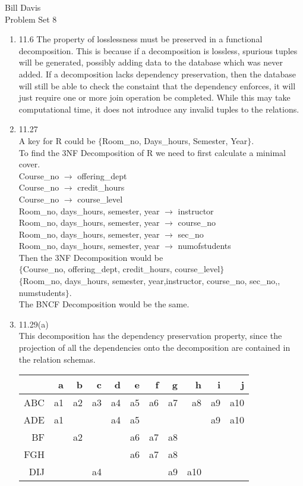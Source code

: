 \documentclass[11pt,fleqn]{article}
\begin{document}
\noindent Bill Davis \\
 Problem Set 8
\begin{enumerate}
\item 11.6 %
The property of losslessness must be preserved in a functional decomposition. This is because if a decomposition is lossless, spurious tuples will be generated, possibly adding data to the database which was never added. If a decomposition lacks dependency preservation, then the database will still be able to check the constaint that the dependency enforces, it will just require one or more join operation be completed. While this may take computational time, it does not introduce any invalid tuples to the relations. 
\item 11.27 \\
A key for R could be $\{$Room\_no, Days\_hours, Semester, Year$\}$. \\
To find the 3NF Decomposition of R we need to first calculate a minimal cover. \\
Course\_no $\rightarrow$ offering\_dept \\
Course\_no $\rightarrow$ credit\_hours \\ 
Course\_no $\rightarrow$ course\_level \\
Room\_no, days\_hours, semester, year $\rightarrow$ instructor \\
Room\_no, days\_hours, semester, year $\rightarrow$ course\_no \\
Room\_no, days\_hours, semester, year $\rightarrow$ sec\_no \\
Room\_no, days\_hours, semester, year $\rightarrow$ numofstudents \\
Then the 3NF Decomposition would be \\
$\{$Course\_no, offering\_dept, credit\_hours, course\_level$\}$ \\
$\{$Room\_no, days\_hours, semester, year,instructor, course\_no, sec\_no,,  numstudents$\}$. \\
The BNCF Decomposition would be the same. 
\item 11.29(a) \\
This decomposition has the dependency preservation property, since the projection of all the dependencies onto the decomposition are contained in the relation schemas. \\
\begin{tabular}{|r|r|r|r|r|r|r|r|r|r|r|}
  \hline
&a&b&c&d&e&f&g&h&i&j \\
\hline
ABC & a1 & a2 & a3&a4&a5&a6&a7&a8&a9&a10\\
ADE & a1 &&&a4&a5&&&&a9&a10\\
BF &&a2&&&a6&a7&a8&&\\
FGH & &&&&a6&a7&a8&&\\
DIJ&&&a4&&&&a9&a10\\
  \hline


\end{tabular}
\end{enumerate}
\end{document}
